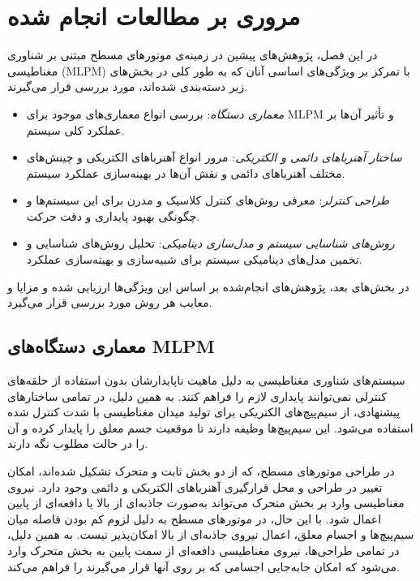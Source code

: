 \setcounter{topnumber}{5}
\setcounter{totalnumber}{5}
\renewcommand{\floatpagefraction}{.8}

\chapter{مروری بر مطالعات انجام شده}
\label{ch:lit-review}

\label{sec:lit-intro}
در این فصل، پژوهش‌های پیشین در زمینه‌ی موتورهای مسطح مبتنی بر شناوری مغناطیسی (MLPM) با تمرکز بر ویژگی‌های اساسی آنان که به طور کلی در بخش‌های زیر دسته‌بندی شده‌اند، مورد بررسی قرار می‌گیرند. 
\begin{itemize}
	\item
	\textit{معماری دستگاه}:
	بررسی انواع معماری‌های موجود برای MLPM و تأثیر آن‌ها بر عملکرد کلی سیستم.
	\item
	\textit{ساختار آهنرباهای دائمی و الکتریکی}:
	مرور انواع آهنرباهای الکتریکی و چینش‌های مختلف آهنربا‌های دائمی و نقش آن‌ها در بهینه‌سازی عملکرد سیستم.
	\item
	\textit{طراحی کنترلر}:
	معرفی روش‌های کنترل کلاسیک و مدرن برای این سیستم‌ها و چگونگی بهبود پایداری و دقت حرکت.
	\item
	\textit{روش‌های شناسایی سیستم و مدل‌سازی دینامیکی}:
	تحلیل روش‌های شناسایی و تخمین مدل‌های دینامیکی سیستم برای شبیه‌سازی و بهینه‌سازی عملکرد.
\end{itemize}
در بخش‌های بعد، پژوهش‌های انجام‌شده بر اساس این ویژگی‌ها ارزیابی شده و مزایا و معایب هر روش مورد بررسی قرار می‌گیرد.

\section{معماری دستگاه‌های MLPM}
\label{sec:lit-architecture}
سیستم‌های شناوری مغناطیسی به دلیل ماهیت ناپایدارشان بدون استفاده از حلقه‌های کنترلی نمی‌توانند پایداری لازم را فراهم کنند. به همین دلیل، در تمامی ساختارهای پیشنهادی، از سیم‌پیچ‌های الکتریکی برای تولید میدان مغناطیسی با شدت کنترل ‌شده استفاده می‌شود. این سیم‌پیچ‌ها وظیفه دارند تا موقعیت جسم معلق را پایدار کرده و آن را در حالت مطلوب نگه ‌دارند.

در طراحی موتورهای مسطح، که از دو بخش ثابت
و متحرک
تشکیل شده‌اند، امکان تغییر در طراحی و محل قرارگیری آهنرباهای الکتریکی و دائمی وجود دارد. نیروی مغناطیسی وارد بر بخش متحرک می‌تواند به‌صورت جاذبه‌ای از بالا یا دافعه‌ای از پایین اعمال شود. با این حال، در موتورهای مسطح به دلیل لزوم کم بودن فاصله میان سیم‌پیچ‌ها و اجسام معلق، اعمال نیروی جاذبه‌ای از بالا امکان‌پذیر نیست. به همین دلیل، در تمامی طراحی‌ها، نیروی مغناطیسی دافعه‌ای از سمت پایین به بخش متحرک وارد می‌شود که امکان جابه‌جایی اجسامی که بر روی آنها قرار می‌گیرند را فراهم می‌کند.

